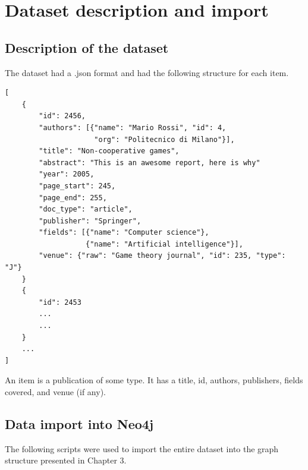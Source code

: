 \documentclass{Configuration_Files/PoliMi3i_thesis}
\begin{document}
\chapter{Dataset description and import}
\label{ch:chapter_one}%
\section{Description of the dataset}
The dataset had a .json format and had the following structure for each item.
\begin{verbatim}
[
    {
        "id": 2456,
        "authors": [{"name": "Mario Rossi", "id": 4, 
                     "org": "Politecnico di Milano"}],
        "title": "Non-cooperative games",
        "abstract": "This is an awesome report, here is why"
        "year": 2005,
        "page_start": 245,
        "page_end": 255,
        "doc_type": "article",
        "publisher": "Springer",
        "fields": [{"name": "Computer science"}, 
                   {"name": "Artificial intelligence"}],
        "venue": {"raw": "Game theory journal", "id": 235, "type": "J"}
    }
    {
        "id": 2453
        ...
        ...
    }
    ...
]
\end{verbatim}
An item is a publication of some type. It has a title, id, authors, publishers, fields covered, and venue (if any).
\section{Data import into Neo4j}
The following scripts were used to import the entire dataset into the graph structure presented in Chapter 3.
\end{document}

